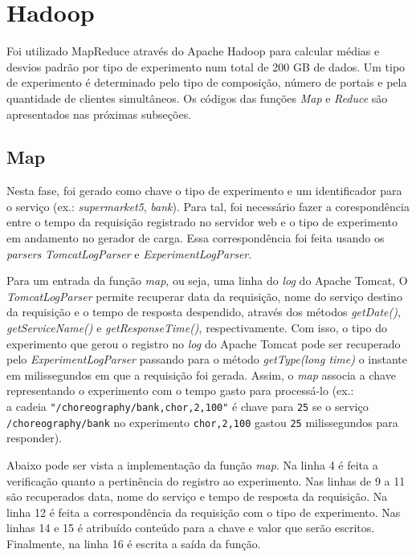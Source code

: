 \documentclass[brazil, a4paper,12pt]{article}
\begin{document}
\section{Hadoop}

Foi utilizado MapReduce através do Apache Hadoop para calcular médias e desvios padrão por tipo de experimento num total de 200 GB de dados. Um tipo de experimento é determinado pelo tipo de composição, número de portais e pela quantidade de clientes simultâneos. Os códigos das funções \emph{Map} e \emph{Reduce} são apresentados nas próximas subseções.

\subsection{Map}

Nesta fase, foi gerado como chave o tipo de experimento e um identificador para o serviço (ex.: \emph{supermarket5}, \emph{bank}). Para tal, foi necessário fazer a corespondência entre o tempo da requisição registrado no servidor web e o tipo de experimento em andamento no gerador de carga. Essa correspondência foi feita usando os \emph{parsers} \emph{TomcatLogParser} e \emph{ExperimentLogParser}.

Para um entrada da função \emph{map}, ou seja, uma linha do \emph{log} do Apache Tomcat, O \emph{TomcatLogParser} permite recuperar data da requisição, nome do serviço destino da requisição e o tempo de resposta despendido, através dos métodos \emph{getDate()}, \emph{getServiceName()} e \emph{getResponseTime()}, respectivamente. Com isso, o tipo do experimento que gerou o registro no \emph{log} do Apache Tomcat pode ser recuperado pelo \emph{ExperimentLogParser} passando para o método \emph{getType(long time)} o instante em milissegundos em que a requisição foi gerada. Assim, o \emph{map} associa a chave representando o experimento com o tempo gasto para processá-lo (ex.:\\ a cadeia \verb|"/choreography/bank,chor,2,100"| é chave para \verb|25| se o serviço\\ \verb|/choreography/bank| no experimento \verb|chor,2,100| gastou \verb|25| milissegundos para responder). 

Abaixo pode ser vista a implementação da função \emph{map}. Na linha 4 é feita a verificação quanto a pertinência do registro ao experimento. Nas linhas de 9 a 11 são recuperados data, nome do serviço e tempo de resposta da requisição. Na linha 12 é feita a correspondência da requisição com o tipo de experimento. Nas linhas 14 e 15 é atribuído conteúdo para a chave e valor que serão escritos. Finalmente, na linha 16 é escrita a saída da função.
\end{document}
